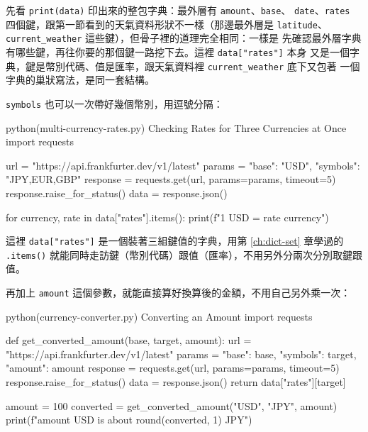 
先看 \texttt{print(data)} 印出來的整包字典：最外層有 \texttt{amount}、\texttt{base}、
\texttt{date}、\texttt{rates} 四個鍵，跟第一節看到的天氣資料形狀不一樣（那邊最外層是
\texttt{latitude}、\texttt{current\_weather} 這些鍵），但骨子裡的道理完全相同：一樣是
先確認最外層字典有哪些鍵，再往你要的那個鍵一路挖下去。這裡 \texttt{data["rates"]} 本身
又是一個字典，鍵是幣別代碼、值是匯率，跟天氣資料裡 \texttt{current\_weather} 底下又包著
一個字典的巢狀寫法，是同一套結構。

\texttt{symbols} 也可以一次帶好幾個幣別，用逗號分隔：

\begin{example}{python}{(multi-currency-rates.py) Checking Rates for Three Currencies at Once}
import requests

url = "https://api.frankfurter.dev/v1/latest"
params = {"base": "USD", "symbols": "JPY,EUR,GBP"}
response = requests.get(url, params=params, timeout=5)
response.raise_for_status()
data = response.json()

for currency, rate in data["rates"].items():
    print(f"1 USD = {rate} {currency}")
\end{example}


這裡 \texttt{data["rates"]} 是一個裝著三組鍵值的字典，用第 \ref{ch:dict-set} 章學過的
\texttt{.items()} 就能同時走訪鍵（幣別代碼）跟值（匯率），不用另外分兩次分別取鍵跟值。

再加上 \texttt{amount} 這個參數，就能直接算好換算後的金額，不用自己另外乘一次：

\begin{example}{python}{(currency-converter.py) Converting an Amount}
import requests


def get_converted_amount(base, target, amount):
    url = "https://api.frankfurter.dev/v1/latest"
    params = {"base": base, "symbols": target, "amount": amount}
    response = requests.get(url, params=params, timeout=5)
    response.raise_for_status()
    data = response.json()
    return data["rates"][target]


amount = 100
converted = get_converted_amount("USD", "JPY", amount)
print(f"{amount} USD is about {round(converted, 1)} JPY")
\end{example}

